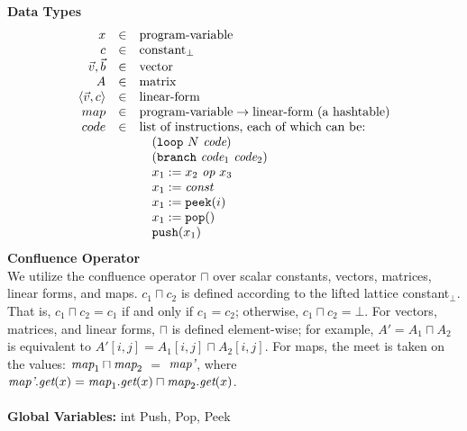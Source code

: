 \newcommand{\la}{$\leftarrow$}
\newcommand{\IND}{\begin{ALC@g}}
\newcommand{\UND}{\end{ALC@g}}
\newcommand{\tup}[2]{\langle{#1}, {#2}\rangle}

\begin{algorithm}
{\bf Data Types}
\begin{equation} \nonumber
\begin{array}{rcl}
x & \in & \mbox{program-variable} \\
c & \in & \mbox{constant}_{\bot} \\
\vec v, \vec b & \in & \mbox{vector} \\
A & \in & \mbox{matrix} \\
\tup{\vec v}{c} & \in & \mbox{linear-form} \\
map & \in & \mbox{program-variable} \rightarrow \mbox{linear-form  (a hashtable)} \\
code & \in & \mbox{list of instructions, each of which can be:} \\
~ & ~ & ~~~ (\mbox{{\tt loop}} ~N~ \mt{code}) \\
~ & ~ & ~~~ (\mbox{{\tt branch}} ~\mt{code}_1~ \mt{code}_2) \\
~ & ~ & ~~~ x_1 := x_2~\mt{op}~x_3 \\
~ & ~ & ~~~ x_1 := \mt{const} \\
~ & ~ & ~~~ x_1 := \mbox{\tt peek}(i) \\
~ & ~ & ~~~ x_1 := \mbox{\tt pop}() \\
~ & ~ & ~~~ \mbox{{\tt push}}(x_1)
\end{array} 
\end{equation}
{\bf Confluence Operator} \\ 
%
We utilize the confluence operator $\sqcap$ over scalar constants,
vectors, matrices, linear forms, and maps.  $c_1 \sqcap c_2$ is
defined according to the lifted lattice constant$_{\bot}$.  That is,
$c_1 \sqcap c_2 = c_1$ if and only if $c_1 = c_2$; otherwise, $c_1
\sqcap c_2 = \bot$.  For vectors, matrices, and linear forms, $\sqcap$
is defined element-wise; for example, $A' = A_1 \sqcap A_2$ is
equivalent to $A'[i,j] = A_1[i,j] \sqcap A_2[i,j]$.  For maps, the
meet is taken on the values: $\mbox{\it map}_1 \sqcap \mbox{\it map}_2$ $=$
$\mbox{\it map'}$, where $\mbox{\it map'}.\mbox{\it get}(x) = \mbox{\it map}_1.\mbox{\it get}(x)
\sqcap \mbox{\it map}_2.\mbox{\it get}(x)$.
~ \\ ~ \\
{\bf Global Variables:} int Push, Pop, Peek \\

\end{algorithm}
